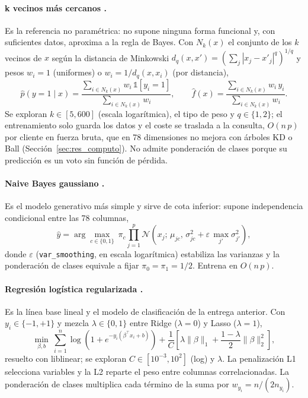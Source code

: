 \documentclass[pdflatex,sn-mathphys-num]{sn-jnl}
\begin{document}
\paragraph{k vecinos más cercanos \cite{cover1967knn}.}
Es la referencia no paramétrica: no supone ninguna forma funcional y, con suficientes datos, aproxima a la regla de Bayes. Con $N_k(x)$ el conjunto de los $k$ vecinos de $x$ según la distancia de Minkowski $d_q(x,x')=(\sum_j|x_j-x'_j|^q)^{1/q}$ y pesos $w_i=1$ (uniformes) o $w_i=1/d_q(x,x_i)$ (por distancia),
\begin{equation}
\hat{p}(y=1\mid x)=\frac{\sum_{i\in N_k(x)} w_i\,\mathbb{1}[y_i=1]}{\sum_{i\in N_k(x)} w_i},\qquad
\hat{f}(x)=\frac{\sum_{i\in N_k(x)} w_i\,y_i}{\sum_{i\in N_k(x)} w_i}.
\end{equation}
Se exploran $k\in[5,600]$ (escala logarítmica), el tipo de peso y $q\in\{1,2\}$; el entrenamiento solo guarda los datos y el coste se traslada a la consulta, $O(n\,p)$ por cliente en fuerza bruta, que en 78 dimensiones no mejora con árboles KD o Ball (Sección~\ref{sec:res_computo}). No admite ponderación de clases porque su predicción es un voto sin función de pérdida.

\paragraph{Naive Bayes gaussiano \cite{hand2001naivebayes}.}
Es el modelo generativo más simple y sirve de cota inferior: supone independencia condicional entre las 78 columnas,
\begin{equation}
\hat{y}=\arg\max_{c\in\{0,1\}}\ \pi_c\prod_{j=1}^{p}\mathcal{N}\!\left(x_j;\,\mu_{jc},\,\sigma^2_{jc}+\varepsilon\,\max_{j'}\sigma^2_{j'}\right),
\end{equation}
donde $\varepsilon$ (\texttt{var\_smoothing}, en escala logarítmica) estabiliza las varianzas y la ponderación de clases equivale a fijar $\pi_0=\pi_1=1/2$. Entrena en $O(n\,p)$.

\paragraph{Regresión logística regularizada \cite{tibshirani1996lasso,hoerl1970ridge}.}
Es la línea base lineal y el modelo de clasificación de la entrega anterior. Con $y_i\in\{-1,+1\}$ y mezcla $\lambda\in\{0,1\}$ entre Ridge ($\lambda=0$) y Lasso ($\lambda=1$),
\begin{equation}
\min_{\beta,b}\ \sum_{i=1}^{n}\log\!\left(1+e^{-y_i(\beta^\top x_i+b)}\right)+\frac{1}{C}\left[\lambda\|\beta\|_1+\frac{1-\lambda}{2}\|\beta\|_2^2\right],
\end{equation}
resuelto con liblinear; se exploran $C\in[10^{-3},10^{2}]$ (log) y $\lambda$. La penalización L1 selecciona variables y la L2 reparte el peso entre columnas correlacionadas. La ponderación de clases multiplica cada término de la suma por $w_{y_i}=n/(2n_{y_i})$.
\end{document}

